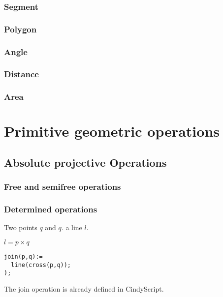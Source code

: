 \documentclass[11pt]{article}
\newcounter{subsubsubsection}[subsubsection]
\begin{document}
\subsubsection{Segment}
\subsubsection{Polygon}
\subsubsection{Angle}
\subsubsection{Distance}
\subsubsection{Area}

\newpage

\section{Primitive geometric operations}
\subsection{Absolute projective Operations}

\subsubsection{Free and semifree operations}

\subsubsection{Determined operations}

\medskip
{} Two points $q$ and $q$.  a line $l$.


\medskip
{} $l=p\times q$

\medskip
{} 
\begin{verbatim}
join(p,q):=
  line(cross(p,q));
);  
\end{verbatim}

\medskip
{} 
The join operation is already defined in CindyScript.
\end{document}
